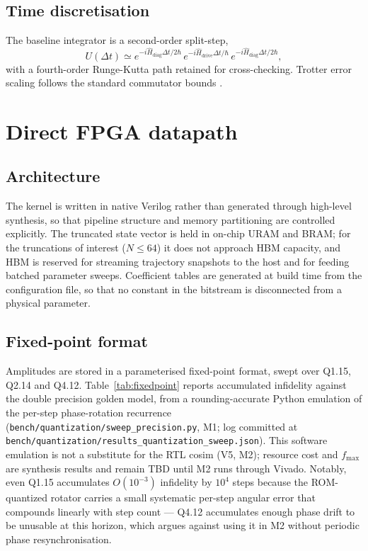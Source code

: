 \documentclass[smallextended]{svjour3}
\begin{document}
\subsection{Time discretisation}

The baseline integrator is a second-order split-step,
\begin{equation}
U(\Delta t) \simeq
e^{-i\hat{H}_{\text{diag}}\Delta t/2\hbar}\,
e^{-i\hat{H}_{\text{drive}}\Delta t/\hbar}\,
e^{-i\hat{H}_{\text{diag}}\Delta t/2\hbar},
\label{eq:trotter}
\end{equation}
with a fourth-order Runge-Kutta path retained for cross-checking. Trotter error scaling
follows the standard commutator bounds \cite{childs2021}.

\section{Direct FPGA datapath}
\label{sec:direct}

\subsection{Architecture}

The kernel is written in native Verilog rather than generated through high-level
synthesis, so that pipeline structure and memory partitioning are controlled explicitly.
The truncated state vector is held in on-chip URAM and BRAM; for the truncations of
interest ($N \le 64$) it does not approach HBM capacity, and HBM is reserved for
streaming trajectory snapshots to the host and for feeding batched parameter sweeps.
Coefficient tables are generated at build time from the configuration file, so that no
constant in the bitstream is disconnected from a physical parameter.

\subsection{Fixed-point format}

Amplitudes are stored in a parameterised fixed-point format, swept over Q1.15, Q2.14 and
Q4.12. Table~\ref{tab:fixedpoint} reports accumulated infidelity against the double
precision golden model, from a rounding-accurate Python emulation of the per-step
phase-rotation recurrence (\texttt{bench/quantization/sweep\_precision.py}, M1; log
committed at \texttt{bench/quantization/results\_quantization\_sweep.json}). This
software emulation is not a substitute for the RTL cosim (V5, M2); resource cost and
$f_{\max}$ are synthesis results and remain TBD until M2 runs through Vivado.
Notably, even Q1.15 accumulates $O(10^{-3})$ infidelity by $10^4$ steps because the
ROM-quantized rotator carries a small systematic per-step angular error that compounds
linearly with step count — Q4.12 accumulates enough phase drift to be unusable at this
horizon, which argues against using it in M2 without periodic phase resynchronisation.
\end{document}
